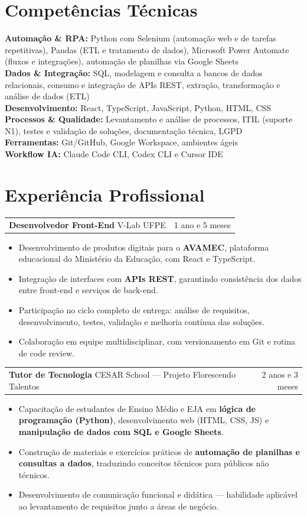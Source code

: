 \documentclass[a4paper,10.5pt]{article}
\makeatletter
\newcommand{\cargo}[3]{%
  \vspace{2pt}
  \begin{tabularx}{\textwidth}{@{}Xr@{}}
    \textbf{#1} \textnormal{\textbar{} #2} & \textcolor{muted}{#3}
  \end{tabularx}%
  \vspace{1pt}
}
\newcommand{\skillline}[2]{\textbf{#1:} #2\\}
\makeatother
\begin{document}
\section{Competências Técnicas}
\skillline{Automação \& RPA}{Python com Selenium (automação web e de tarefas repetitivas), Pandas (ETL e tratamento de dados), Microsoft Power Automate (fluxos e integrações), automação de planilhas via Google Sheets}
\skillline{Dados \& Integração}{SQL, modelagem e consulta a bancos de dados relacionais, consumo e integração de APIs REST, extração, transformação e análise de dados (ETL)}
\skillline{Desenvolvimento}{React, TypeScript, JavaScript, Python, HTML, CSS}
\skillline{Processos \& Qualidade}{Levantamento e análise de processos, ITIL (suporte N1), testes e validação de soluções, documentação técnica, LGPD}
\skillline{Ferramentas}{Git/GitHub, Google Workspace, ambientes ágeis}
\skillline{Workflow IA}{Claude Code CLI, Codex CLI e Cursor IDE}


\vspace{-0.5em}
\section{Experiência Profissional}

\cargo{Desenvolvedor Front-End}{V-Lab UFPE}{1 ano e 5 meses}
\begin{itemize}
  \item Desenvolvimento de produtos digitais para o \textbf{AVAMEC}, plataforma educacional do Ministério da Educação, com React e TypeScript.
  \item Integração de interfaces com \textbf{APIs REST}, garantindo consistência dos dados entre front-end e serviços de back-end.
  \item Participação no ciclo completo de entrega: análise de requisitos, desenvolvimento, testes, validação e melhoria contínua das soluções.
  \item Colaboração em equipe multidisciplinar, com versionamento em Git e rotina de code review.
\end{itemize}

\cargo{Tutor de Tecnologia}{CESAR School --- Projeto Florescendo Talentos}{2 anos e 3 meses}
\begin{itemize}
  \item Capacitação de estudantes de Ensino Médio e EJA em \textbf{lógica de programação (Python)}, desenvolvimento web (HTML, CSS, JS) e \textbf{manipulação de dados com SQL e Google Sheets}.
  \item Construção de materiais e exercícios práticos de \textbf{automação de planilhas e consultas a dados}, traduzindo conceitos técnicos para públicos não técnicos.
  \item Desenvolvimento de comunicação funcional e didática --- habilidade aplicável ao levantamento de requisitos junto a áreas de negócio.
\end{itemize}
\end{document}
